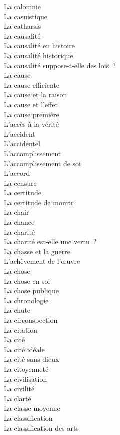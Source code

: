 \documentclass[a4paper,12pt]{article}
\begin{document}
La calomnie \\
La casuistique \\
La catharsis \\
La causalité \\
La causalité en histoire \\
La causalité historique \\
La causalité suppose-t-elle des lois ? \\
La cause \\
La cause efficiente \\
La cause et la raison \\
La cause et l'effet \\
La cause première \\
L'accès à la vérité \\
L'accident \\
L'accidentel \\
L'accomplissement \\
L'accomplissement de soi \\
L'accord \\
La censure \\
La certitude \\
La certitude de mourir \\
La chair \\
La chance \\
La charité \\
La charité est-elle une vertu ? \\
La chasse et la guerre \\
L'achèvement de l'œuvre \\
La chose \\
La chose en soi \\
La chose publique \\
La chronologie \\
La chute \\
La circonspection \\
La citation \\
La cité \\
La cité idéale \\
La cité sans dieux \\
La citoyenneté \\
La civilisation \\
La civilité \\
La clarté \\
La classe moyenne \\
La classification \\
La classification des arts \\
\end{document}
